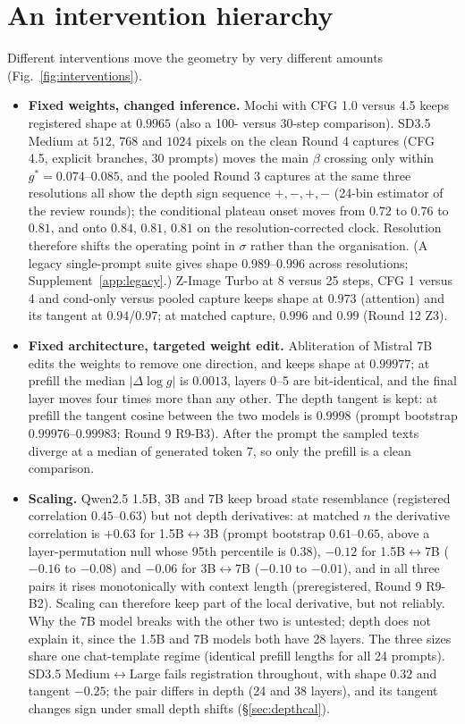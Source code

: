 \documentclass[11pt]{article}
\begin{document}
\section{An intervention hierarchy}\label{sec:interventions}

Different interventions move the geometry by very different amounts (Fig.~\ref{fig:interventions}).
\begin{itemize}
 \item \textbf{Fixed weights, changed inference.} Mochi with CFG 1.0 versus 4.5 keeps registered shape at $0.9965$ (also a 100- versus 30-step comparison). SD3.5 Medium at $512$, $768$ and $1024$ pixels on the clean Round 4 captures (CFG 4.5, explicit branches, 30 prompts) moves the main $\beta$ crossing only within $g^*=0.074$--$0.085$, and the pooled Round 3 captures at the same three resolutions all show the depth sign sequence $+,-,+,-$ (24-bin estimator of the review rounds); the conditional plateau onset moves from $0.72$ to $0.76$ to $0.81$, and onto $0.84$, $0.81$, $0.81$ on the resolution-corrected clock. Resolution therefore shifts the operating point in $\sigma$ rather than the organisation. (A legacy single-prompt suite gives shape $0.989$--$0.996$ across resolutions; Supplement~\ref{app:legacy}.) Z-Image Turbo at 8 versus 25 steps, CFG 1 versus 4 and cond-only versus pooled capture keeps shape at $0.973$ (attention) and its tangent at $0.94$/$0.97$; at matched capture, $0.996$ and $0.99$ (Round 12 Z3).
 \item \textbf{Fixed architecture, targeted weight edit.} Abliteration of Mistral 7B \citep{arditi2024refusal} edits the weights to remove one direction, and keeps shape at $0.99977$; at prefill the median $|\Delta\log g|$ is $0.0013$, layers 0--5 are bit-identical, and the final layer moves four times more than any other. The depth tangent is kept: at prefill the tangent cosine between the two models is $0.9998$ (prompt bootstrap $0.99976$--$0.99983$; Round 9 R9-B3). After the prompt the sampled texts diverge at a median of generated token 7, so only the prefill is a clean comparison.
 \item \textbf{Scaling.} Qwen2.5 1.5B, 3B and 7B keep broad state resemblance (registered correlation $0.45$--$0.63$) but not depth derivatives: at matched $n$ the derivative correlation is $+0.63$ for 1.5B$\leftrightarrow$3B (prompt bootstrap $0.61$--$0.65$, above a layer-permutation null whose 95th percentile is $0.38$), $-0.12$ for 1.5B$\leftrightarrow$7B ($-0.16$ to $-0.08$) and $-0.06$ for 3B$\leftrightarrow$7B ($-0.10$ to $-0.01$), and in all three pairs it rises monotonically with context length (preregistered, Round 9 R9-B2). Scaling can therefore keep part of the local derivative, but not reliably. Why the 7B model breaks with the other two is untested; depth does not explain it, since the 1.5B and 7B models both have 28 layers. The three sizes share one chat-template regime (identical prefill lengths for all 24 prompts). SD3.5 Medium$\leftrightarrow$Large fails registration throughout, with shape $0.32$ and tangent $-0.25$; the pair differs in depth (24 and 38 layers), and its tangent changes sign under small depth shifts (\S\ref{sec:depthcal}).

\end{itemize}
\end{document}
